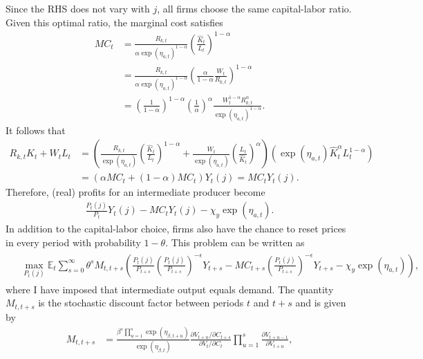 \documentclass[12 pt, oneside]{article}
\theoremstyle{definition}
\theoremstyle{definition}
\theoremstyle{definition}
\newcommand{\E}{\mathbb{E}}
\begin{document}
Since the RHS does not vary with $j$, all firms choose the same capital-labor ratio. Given this optimal ratio, the marginal cost satisfies
\begin{align*}
  MC_t & = \frac{R_{k, t}}{\alpha \exp(\eta_{a, t})^{1 - \alpha}}\left(\frac{\hat{K}_t}{L_t}\right)^{1 - \alpha}\\
       & =  \frac{R_{k, t}}{\alpha \exp(\eta_{a, t})^{1 - \alpha}}\left(\frac{\alpha}{1 - \alpha} \frac{W_t}{R_{k, t}}\right)^{1 - \alpha}\\
       & =  \left(\frac{1}{1 - \alpha}\right)^{1 - \alpha}\left(\frac{1}{\alpha}\right)^{\alpha}\frac{W_t^{1 - \alpha}R_{k, t}^{\alpha}}{ \exp(\eta_{a, t})^{1 - \alpha}}.
\end{align*}
It follows that
\begin{align*}
  R_{k, t}\hat{K}_t + W_tL_t & = \left(\frac{R_{k, t}}{\exp(\eta_{a, t})}\left(\frac{\hat{K}_t}{L_t}\right)^{1 - \alpha} + \frac{W_t}{\exp(\eta_{a, t})}\left(\frac{L_t}{\hat{K}_t}\right)^{\alpha}\right)(\exp(\eta_{a, t})\hat{K}_t^\alpha L_t^{1 - \alpha})\\
                       & = \left(\alpha MC_t + (1 - \alpha)MC_t\right)Y_t(j) = MC_t Y_t(j).
\end{align*}
Therefore, (real) profits for an intermediate producer become
\begin{align}
  \frac{P_t(j)}{P_t}Y_t(j) - MC_t Y_t(j) - \chi_y \exp(\eta_{a, t}).
\end{align}
In addition to the capital-labor choice, firms also have the chance to reset prices in every period with probability $1 - \theta$. This problem can be
written as
\begin{align}
  \begin{split}
  &\max_{P_t(j)} \E_t\sum_{s = 0}^\infty\theta^sM_{t, t + s}\left(\frac{P_t(j)}{P_{t + s}}\left(\frac{P_t(j)}{P_{t + s}}\right)^{-\epsilon}Y_{t + s} - MC_{t + s}\left(\frac{P_t(j)}{P_{t + s}}\right)^{-\epsilon}Y_{t + s} - \chi_y\exp(\eta_{a, t})\right),
  \end{split}
\end{align}
where I have imposed that intermediate output equals demand. The quantity $M_{t, t + s}$ is the stochastic discount factor between periods $t$ and $t + s$ and is given by
\begin{align}
  M_{t, t + s} & = \frac{\beta^s \prod_{u = 1}^s\exp(\eta_{\beta, t + u})}{\exp(\eta_{\beta, t})}\frac{\partial V_{t + u} / \partial C_{t + s}}{\partial V_t / \partial C_t} \prod_{u = 1}^s \frac{\partial V_{t + u - 1}}{\partial V_{t + u}},
\end{align}
\end{document}
